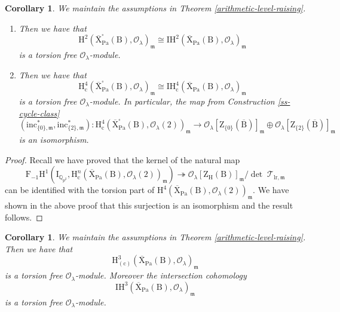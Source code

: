 \documentclass[10pt]{amsart}
\numberwithin{equation}{section}
\newtheorem{corollary}[equation]{Corollary}
\theoremstyle{definition}
\def\lr{\mathrm{lr}}
\def\Pa{\mathrm{Pa}}
\def\calO{\mathcal{O}}
\def\calT{\mathcal{T}}
\def\fracm{\mathfrak{m}}
\def\QQ{\mathbb{Q}}
\def\rmc{\mathrm{c}}
\def\rmB{\mathrm{B}}
\def\rmH{\mathrm{H}}
\def\rmX{\mathrm{X}}
\def\rmZ{\mathrm{Z}}
\begin{document}
\begin{corollary}\label{no-torsion}
We maintain the assumptions in Theorem \ref{arithmetic-level-raising}. 
\begin{enumerate}
\item Then we have that
\begin{equation*}
\rmH^{2}(\overline{\rmX}^{\square}_{\Pa}(\rmB), \calO_{\lambda})_{\fracm}\cong\mathrm{IH}^{2}(\overline{\rmX}_{\Pa}(\rmB), \calO_{\lambda})_{\fracm}
\end{equation*}
is a torsion free $\calO_{\lambda}$-module.
\item Then we have that
\begin{equation*}
\rmH^{4}_{\rmc}(\overline{\rmX}^{\square}_{\Pa}(\rmB), \calO_{\lambda})_{\fracm}\cong\mathrm{IH}^{4}_{\rmc}(\overline{\rmX}_{\Pa}(\rmB), \calO_{\lambda})_{\fracm}
\end{equation*}
is a torsion free $\calO_{\lambda}$-module. In particular, the map from Construction \ref{ss-cycle-class}
\begin{equation*}
(\mathrm{inc}^{\ast}_{\{0\}, \fracm}, \mathrm{inc}^{\ast}_{\{2\}, \fracm}): \rmH^{4}_{\rmc}(\overline{\rmX}^{\square}_{\Pa}(\rmB), \calO_{\lambda}(2))_{\fracm}\rightarrow \calO_{\lambda}[\rmZ_{\{0\}}(\overline{\rmB})]_{\fracm}\oplus\calO_{\lambda}[\rmZ_{\{2\}}(\overline{\rmB})]_{\fracm} 
\end{equation*}
is an isomorphism.
\end{enumerate}
\end{corollary}
\begin{proof}
Recall we have proved that the kernel of the natural map
\begin{equation*}
\mathrm{F}_{-1}\mathrm{H}^{1}(\mathrm{I}_{\QQ_{p^{2}}}, \mathrm{H}^{n}_{\rmc}(\overline{\rmX}_{\Pa}(\rmB), \calO_{\lambda}(2))_{\fracm})\twoheadrightarrow 
\calO_{\lambda}[\rmZ_{\rmH}(\rmB)]_{\fracm}/\det\phantom{.}\calT_{\lr, \fracm}
\end{equation*}
can be identified with the torsion part of $\rmH^{4}(\overline{\rmX}_{\Pa}(\rmB), \calO_{\lambda}(2))_{\fracm}$. We have shown in the above proof that this surjection is an isomorphism and the result follows.
\end{proof}
\begin{corollary}
We maintain the assumptions in Theorem \ref{arithmetic-level-raising}. Then we have that
\begin{equation*}
\mathrm{H}^{3}_{(\rmc)}(\overline{\rmX}_{\Pa}(\rmB), \calO_{\lambda})_{\fracm}
\end{equation*}
is a torsion free $\calO_{\lambda}$-module.
Moreover the intersection cohomology 
\begin{equation*}
\mathrm{IH}^{3}(\overline{\rmX}_{\Pa}(\rmB), \calO_{\lambda})_{\fracm}
\end{equation*}
is a torsion free $\calO_{\lambda}$-module.
\end{corollary}
\end{document}
